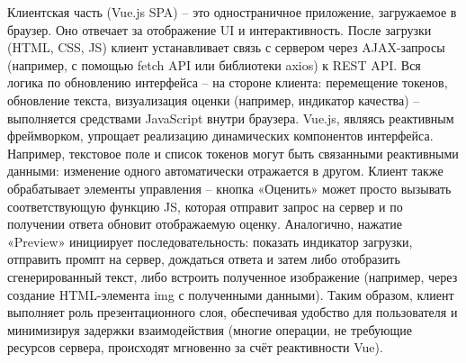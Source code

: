 Клиентская часть (Vue.js SPA) – это одностраничное приложение, загружаемое в браузер. Оно отвечает за отображение UI и интерактивность. После загрузки (HTML, CSS, JS) клиент устанавливает связь с сервером через AJAX-запросы (например, с помощью fetch API или библиотеки axios) к REST API. Вся логика по обновлению интерфейса – на стороне клиента: перемещение токенов, обновление текста, визуализация оценки (например, индикатор качества) – выполняется средствами JavaScript внутри браузера. Vue.js, являясь реактивным фреймворком, упрощает реализацию динамических компонентов интерфейса\cite{vuejs:wiki}. Например, текстовое поле и список токенов могут быть связанными реактивными данными: изменение одного автоматически отражается в другом. Клиент также обрабатывает элементы управления – кнопка «Оценить» может просто вызывать соответствующую функцию JS, которая отправит запрос на сервер и по получении ответа обновит отображаемую оценку. Аналогично, нажатие «Preview» инициирует последовательность: показать индикатор загрузки, отправить промпт на сервер, дождаться ответа и затем либо отобразить сгенерированный текст, либо встроить полученное изображение (например, через создание HTML-элемента \<img\> с полученными данными). Таким образом, клиент выполняет роль презентационного слоя, обеспечивая удобство для пользователя и минимизируя задержки взаимодействия (многие операции, не требующие ресурсов сервера, происходят мгновенно за счёт реактивности Vue).

